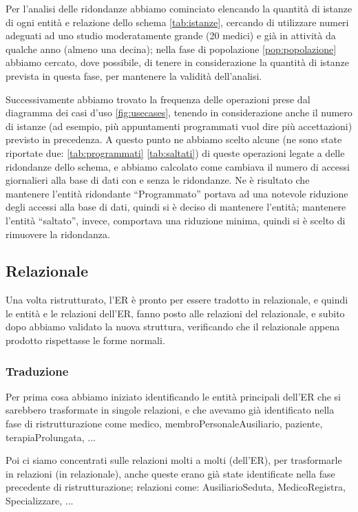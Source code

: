 \documentclass[11pt]{article}
\begin{document}
Per l'analisi delle ridondanze abbiamo cominciato elencando la quantità di istanze di ogni entità e relazione dello schema \ref{tab:istanze}, cercando di utilizzare numeri adeguati ad uno studio moderatamente grande (20 medici) e già in attività da qualche anno (almeno una decina); nella fase di popolazione \ref{pop:popolazione} abbiamo cercato, dove possibile, di tenere in considerazione la quantità di istanze prevista in questa fase, per mantenere la validità dell'analisi.

Successivamente abbiamo trovato la frequenza delle operazioni prese dal diagramma dei casi d'uso \ref{fig:usecases}, tenendo in considerazione anche il numero di istanze (ad esempio, più appuntamenti programmati vuol dire più accettazioni) previsto in precedenza. A questo punto ne abbiamo scelto alcune (ne sono state riportate due: \ref{tab:programmati} \ref{tab:saltati}) di queste operazioni legate a delle ridondanze dello schema, e abbiamo calcolato come cambiava il numero di accessi giornalieri alla base di dati con e senza le ridondanze. Ne è risultato che mantenere l'entità ridondante ``Programmato'' portava ad una notevole riduzione degli accessi alla base di dati, quindi si è deciso di mantenere l'entità; mantenere l'entità ``saltato'', invece, comportava una riduzione minima, quindi si è scelto di rimuovere la ridondanza.

\subsection{Relazionale}
Una volta ristrutturato, l'ER è pronto per essere tradotto in relazionale, e quindi le entità e le relazioni dell'ER, fanno posto alle relazioni del relazionale, e subito dopo abbiamo 
validato la nuova struttura, verificando che il relazionale appena prodotto rispettasse le forme normali.
\subsubsection{Traduzione}

Per prima cosa abbiamo iniziato identificando le entità principali dell'ER che si sarebbero trasformate in singole relazioni, e che avevamo già identificato nella fase di ristrutturazione come medico, membroPersonaleAusiliario, paziente, terapiaProlungata, ...

Poi ci siamo concentrati sulle relazioni molti a molti (dell'ER), per trasformarle in relazioni (in relazionale), anche queste erano già state identificate nella fase precedente di ristrutturazione; relazioni come: AusiliarioSeduta, MedicoRegistra, Specializzare, ...
\end{document}
